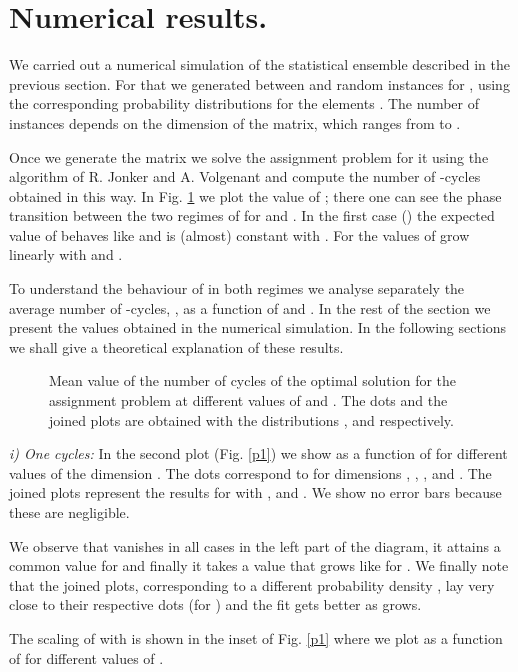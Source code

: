 \documentclass[]{iopart}
\begin{document}
\section{Numerical results.}

We carried out a numerical simulation of the
statistical ensemble described in the previous section.
For that we generated between  and 
random instances for , using the corresponding
probability distributions for the elements . 
The number of instances depends
on the dimension of the matrix, which ranges from  to 
.

Once we generate the matrix  we solve the assignment
problem for it using the algorithm of R. Jonker and A. Volgenant
\cite{JV} and compute the number of -cycles  obtained in this way.
 In Fig. \ref{fig1} we plot the value of 
; 
there one can see the phase transition between the two regimes of 
 for  and . 
In the first case () the expected value of 
 behaves like  and is (almost) constant with . 
For  the values of  
grow linearly with  and 
\cite{EstFal}.


To understand the behaviour of  in both regimes
we analyse separately the average number of -cycles, , 
as a function of  and .
In the rest of the section we present the values
obtained in the numerical simulation.  In the following 
sections we shall give a theoretical explanation of these results.
 
\begin{figure}[h!]
\caption{\small Mean value of the number of cycles of the optimal solution for
  the assignment problem at different values of  and .
The dots and the joined plots are obtained with the distributions 
, 
 and
 respectively. }
\label{fig1}
\end{figure}


{\it i) One cycles:}
In the second plot (Fig. \ref{p1}) we show  as a function of  
for different values of the dimension . The dots
correspond to  for dimensions , , , 
 and . The joined plots represent the results for
 with ,  and . We show no error bars 
because these are negligible. 

We observe that  vanishes in all cases in the left part
of the diagram, it attains a common value  for 
 and finally it takes a value 
that grows like  for .
We finally note that the joined plots, corresponding 
to a different probability density ,
lay very close to their respective dots
(for ) and the fit 
gets better as  grows.

The scaling of  with  is shown 
 in the inset of Fig. \ref{p1} where  we 
plot   as a function of  
for different values of . 
\end{document}
